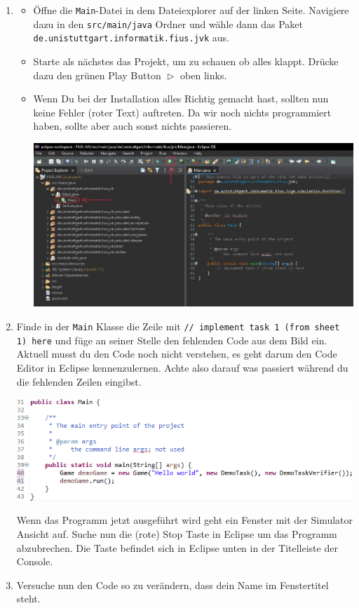 \begin{enumerate}
    \item
    \begin{itemize}
        \item Öffne die \texttt{Main}-Datei in dem Dateiexplorer auf der linken Seite. Navigiere dazu in den \texttt{src/main/java} Ordner und wähle dann das Paket \texttt{de.unistuttgart.informatik.fius.jvk} aus.
        \item Starte als nächstes das Projekt, um zu schauen ob alles klappt. Drücke dazu den grünen Play Button $\vartriangleright$ oben links.
        \item Wenn Du bei der Installation alles Richtig gemacht hast, sollten nun keine Fehler (roter Text) auftreten. Da wir noch nichts programmiert haben, sollte aber auch sonst nichts passieren.
        \begin{center}
            \includegraphics[width=\linewidth]{./figures/ide.jpg} %
        \end{center}
    \end{itemize}

    \item Finde in der \lstinline{Main} Klasse die Zeile mit \lstinline{// implement task 1 (from sheet 1) here} und füge an seiner Stelle den fehlenden Code aus dem Bild ein.
    Aktuell musst du den Code noch nicht verstehen, es geht darum den Code Editor in Eclipse kennenzulernen.
    Achte also darauf was passiert während du die fehlenden Zeilen eingibst.

    \includegraphics[width=\linewidth]{./figures/code.1.png}

    Wenn das Programm jetzt ausgeführt wird geht ein Fenster mit der Simulator Ansicht auf.
    Suche nun die (rote) Stop Taste in Eclipse um das Programm abzubrechen.
    Die Taste befindet sich in Eclipse unten in der Titelleiste der Console.
    \item Versuche nun den Code so zu verändern, dass dein Name im Fenstertitel steht.
\end{enumerate}


